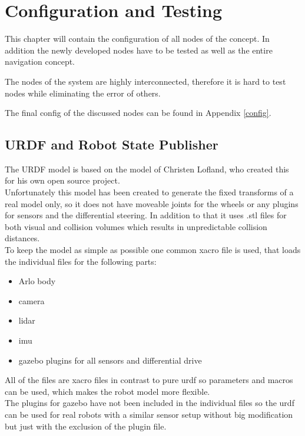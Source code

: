 \chapter{Configuration and Testing}
\label{configurationandtesting}

This chapter will contain the configuration of all nodes of the concept. In addition the newly developed nodes have to be tested as well as the entire navigation concept.

The nodes of the system are highly interconnected, therefore it is hard to test nodes while eliminating the error of others.

The final config of the discussed nodes can be found in Appendix \ref{config}.

\section{URDF and Robot State Publisher}

The URDF model is based on the model of Christen Lofland, who created this for his own open source project\cite{chrisl8}.\\

Unfortunately this model has been created to generate the fixed transforms of a real model only, so it does not have moveable joints for the wheels or any plugins for sensors and the differential steering. In addition to that it uses .stl files for both visual and collision volumes which results in unpredictable collision distances.\\

To keep the model as simple as possible one common xacro file is used, that loads the individual files for the following parts:
\begin{itemize}
	\item Arlo body
	\item camera
	\item lidar
	\item imu
	\item gazebo plugins for all sensors and differential drive
\end{itemize}

All of the files are xacro files in contrast to pure urdf so parameters and macros can be used, which makes the robot model more flexible.\\

The plugins for gazebo have not been included in the individual files so the urdf can be used for real robots with a similar sensor setup without big modification but just with the exclusion of the plugin file.

